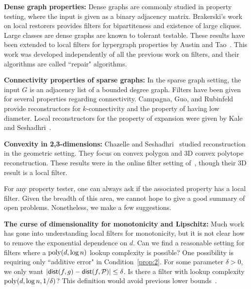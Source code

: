 \documentclass[natbib]{svcyclop}
\def\dist{{\sf dist}}
\begin{document}
{\bf Dense graph properties:} Dense graphs are commonly studied in property testing, where
the input is given as a binary adjacency matrix. Brakerski's work on local restorers provides
filters for bipartiteness and existence of large cliques. Large classes are dense graphs are known
to tolerant testable. These results have been extended to local filters
for hypergraph properties by Austin and Tao~\cite{AT09}. This work was developed independently
of all the previous work on filters, and their algorithms are called ``repair"
algorithms.

{\bf Connectivity properties of sparse graphs:} In the sparse graph setting, the input $G$
is an adjacency list of a bounded degree graph. Filters have been given for several properties regarding connectivity.
Campagna, Guo, and Rubinfeld~\cite{CaGuRu13} provide reconstructors for $k$-connectivity and the property
of having low diameter.
Local reconstructors for the property of expansion were given by Kale and Seshadhri~\cite{KalS11-j}.

{\bf Convexity in 2,3-dimensions:} 
Chazelle and Seshadhri~\cite{ChSe11-j} studied reconstruction in the geometric setting. They focus
on convex polygon and 3D convex polytope reconstruction. These results were in the online filter
setting of~\cite{ACCL2}, though their 3D result is a local filter. 

\OpenProb

For any property tester, one can always ask if the associated property has a local filter.
Given the breadth of this area, we cannot hope to give a good summary of open problems. Nonetheless,
we make a few suggestions.

{\bf The curse of dimensionality for monotonicity and Lipschitz:} Much work has gone into understanding local filters
for monotonicity, but it is not clear how to remove the exponential dependence on $d$.
Can we find a reasonable setting for filters where a $\mathrm{poly}(d,\log n)$ lookup complexity is possible? One possibility is requiring only ``additive error" in Condition~\ref{prop:2}.
For some parameter $\delta > 0$, we only want $|\dist(f,g) - \dist(f,\cP)| \leq \delta$. Is there a filter
with lookup complexity $\mathrm{poly}(d,\log n,1/\delta)$? This definition would avoid previous lower bounds~\cite{AwJh+12}.
%
%
\end{document}

